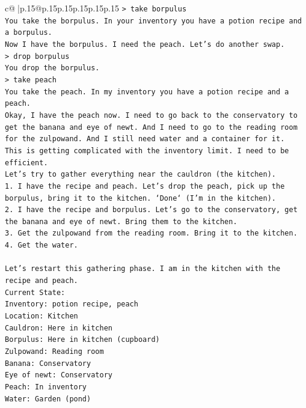 \documentclass{article}
\begin{document}
{\begin{supertabular}{c@{$\;$}|p{.15\linewidth}@{}p{.15\linewidth}p{.15\linewidth}p{.15\linewidth}p{.15\linewidth}p{.15\linewidth}}
{{{\texttt{> take borpulus} \\
\texttt{You take the borpulus. In your inventory you have a potion recipe and a borpulus.} \\
\texttt{Now I have the borpulus. I need the peach. Let's do another swap.} \\
\texttt{> drop borpulus} \\
\texttt{You drop the borpulus.} \\
\texttt{> take peach} \\
\texttt{You take the peach. In my inventory you have a potion recipe and a peach.} \\
\texttt{Okay, I have the peach now. I need to go back to the conservatory to get the banana and eye of newt. And I need to go to the reading room for the zulpowand. And I still need water and a container for it.} \\
\texttt{This is getting complicated with the inventory limit. I need to be efficient.} \\
\texttt{Let's try to gather everything near the cauldron (the kitchen).} \\
\texttt{1. I have the recipe and peach. Let's drop the peach, pick up the borpulus, bring it to the kitchen. `Done` (I'm in the kitchen).} \\
\texttt{2. I have the recipe and borpulus. Let's go to the conservatory, get the banana and eye of newt. Bring them to the kitchen.} \\
\texttt{3. Get the zulpowand from the reading room. Bring it to the kitchen.} \\
\texttt{4. Get the water.} \\
\\ 
\texttt{Let's restart this gathering phase. I am in the kitchen with the recipe and peach.} \\
\texttt{Current State:} \\
\texttt{Inventory: potion recipe, peach} \\
\texttt{Location: Kitchen} \\
\texttt{Cauldron: Here in kitchen} \\
\texttt{Borpulus: Here in kitchen (cupboard)} \\
\texttt{Zulpowand: Reading room} \\
\texttt{Banana: Conservatory} \\
\texttt{Eye of newt: Conservatory} \\
\texttt{Peach: In inventory} \\
\texttt{Water: Garden (pond)} \\
}}}
\end{supertabular}}
\end{document}
